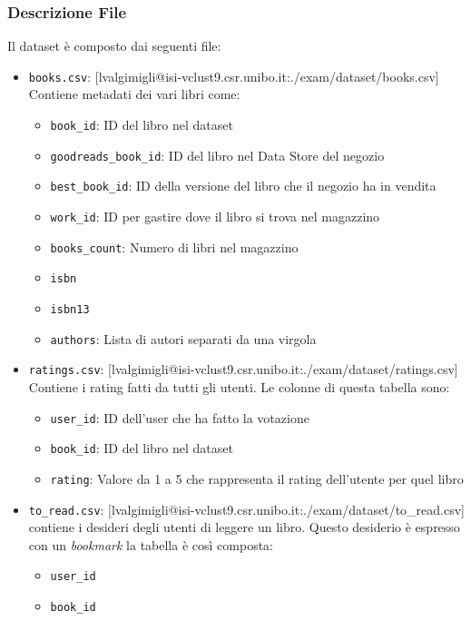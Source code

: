 \documentclass[11pt]{article}
\begin{document}
\subsubsection{Descrizione File}
Il dataset è composto dai seguenti file:
\begin{itemize}
    \item \texttt{books.csv}: [lvalgimigli@isi-vclust9.csr.unibo.it:./exam/dataset/books.csv] Contiene metadati dei vari libri come:
    \begin{itemize}
        \item \texttt{book\_id}: ID del libro nel dataset
        \item \texttt{goodreads\_book\_id}: ID del libro nel Data Store del negozio
        \item \texttt{best\_book\_id}: ID della versione del libro che il negozio ha in vendita
        \item \texttt{work\_id}: ID per gastire dove il libro si trova nel magazzino
        \item \texttt{books\_count}: Numero di libri nel magazzino
        \item \texttt{isbn}
        \item \texttt{isbn13}
        \item \texttt{authors}: Lista di autori separati da una virgola
    \end{itemize}
    \item \texttt{ratings.csv}: [lvalgimigli@isi-vclust9.csr.unibo.it:./exam/dataset/ratings.csv] Contiene i rating fatti da tutti gli utenti. Le colonne di questa tabella sono:
    \begin{itemize}
        \item \texttt{user\_id}: ID dell'user che ha fatto la votazione
        \item \texttt{book\_id}: ID del libro nel dataset
        \item \texttt{rating}: Valore da 1 a 5 che rappresenta il rating dell'utente per quel libro
    \end{itemize}
    \item \texttt{to\_read.csv}: [lvalgimigli@isi-vclust9.csr.unibo.it:./exam/dataset/to_read.csv] contiene i desideri degli utenti di leggere un libro. Questo desiderio è espresso con un \textit{bookmark}
            la tabella è così composta:
    \begin{itemize}
        \item \texttt{user\_id}
        \item \texttt{book\_id}
    \end{itemize}

\end{itemize}
\end{document}
